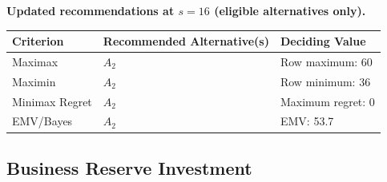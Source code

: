 \begin{enumerate}
\textbf{Updated recommendations at $s=16$ (eligible alternatives only).}
\begin{center}
\begin{tabular}{lll}\toprule
Criterion & Recommended Alternative(s) & Deciding Value\\\midrule
Maximax & $A_2$ & Row maximum: 60\\
Maximin & $A_2$ & Row minimum: 36\\
Minimax Regret & $A_2$ & Maximum regret: 0\\
EMV/Bayes & $A_2$ & EMV: 53.7\\\bottomrule
\end{tabular}
\end{center}
\end{enumerate}


\subsection{Business Reserve Investment}\label{sec:c8-investment}
